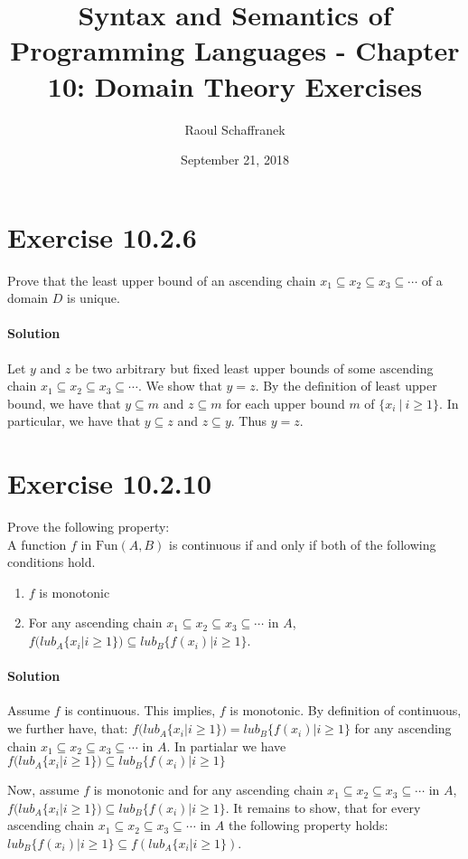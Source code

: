 \documentclass{article}[12pt]
\title{Syntax and Semantics of Programming Languages - Chapter 10: Domain Theory Exercises}
\author{Raoul Schaffranek}
\date{September 21, 2018}
\newcommand{\lub}{\ensuremath{\textit{}{lub}}}
\newcommand{\Fun}{\ensuremath{\text{Fun}}}
\begin{document}
\maketitle

\section{Exercise 10.2.6}
Prove that the least upper bound of an ascending chain $x_1 \subseteq x_2 \subseteq x_3 \subseteq \cdots$ of a domain $D$ is unique.
\paragraph{Solution}
Let $y$ and $z$ be two arbitrary but fixed least upper bounds of some ascending chain $x_1 \subseteq x_2 \subseteq x_3 \subseteq \cdots$.
We show that $y = z$.
By the definition of least upper bound, we have that $y \subseteq m$ and $z \subseteq m$ for each upper bound $m$ of $\{x_i\ |\ i \geq 1\}$. In particular, we have that $y \subseteq z$ and $z \subseteq y$. Thus $y = z$.

\section{Exercise 10.2.10}
Prove the following property:\\
A function $f$ in $\Fun(A,B)$ is continuous if and only if both of the following conditions hold.
\begin{enumerate}[label=\alph*)]
    \item $f$ is monotonic
    \item For any ascending chain $x_1 \subseteq x_2 \subseteq x_3 \subseteq \cdots$ in $A$, $f(\lub_A\{x_i|i\geq 1\}) \subseteq \lub_B\{f(x_i)|i\geq 1\}$.
\end{enumerate}

\paragraph{Solution}

Assume $f$ is continuous. This implies, $f$ is monotonic.
By definition of continuous, we further have, that:
$f(\lub_A\{x_i|i\geq 1\}) = \lub_B\{f(x_i)|i\geq 1\}$ for any ascending chain $x_1 \subseteq x_2 \subseteq x_3 \subseteq \cdots$ in $A$. In partialar we have $f(\lub_A\{x_i|i\geq 1\}) \subseteq \lub_B\{f(x_i)|i\geq 1\}$

Now, assume $f$ is monotonic and for any ascending chain $x_1 \subseteq x_2 \subseteq x_3 \subseteq \cdots$ in $A$, $f(\lub_A\{x_i|i\geq 1\}) \subseteq \lub_B\{f(x_i)|i\geq 1\}$.
It remains to show, that for every ascending chain $x_1 \subseteq x_2 \subseteq x_3 \subseteq \cdots$ in $A$ the following property holds: $\lub_B\{f(x_i)|i\geq 1\} \subseteq f(\lub_A\{x_i|i\geq 1\})$.
\end{document}

